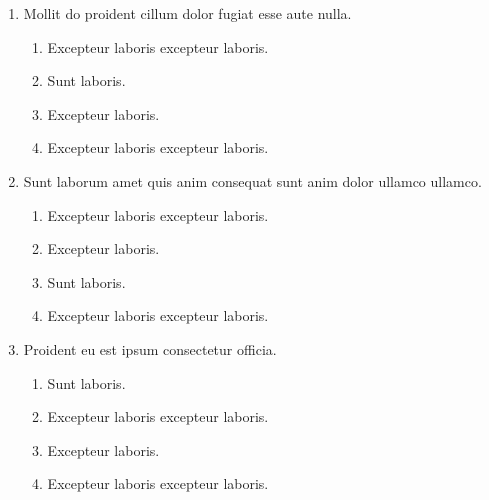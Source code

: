 \documentclass[a4paper,12pt]{article}
\begin{document}
\begin{enumerate}[label=\textbf{\arabic*.}]
\item Mollit do proident cillum dolor fugiat esse aute nulla.
\begin{multicols}{2}
	\begin{enumerate}
		\item  Excepteur laboris excepteur laboris.
  
		\item  Sunt laboris.
    
		\item  Excepteur laboris.
    
		\item  Excepteur laboris excepteur laboris.
    
	\end{enumerate}

\end{multicols}
\item Sunt laborum amet quis anim consequat sunt anim dolor ullamco ullamco.
\begin{multicols}{2}
	\begin{enumerate}
		\item  Excepteur laboris excepteur laboris.
  
		\item  Excepteur laboris.
    
		\item  Sunt laboris.
    
		\item  Excepteur laboris excepteur laboris.
    
	\end{enumerate}

\end{multicols}
\item Proident eu est ipsum consectetur officia.
\begin{multicols}{2}
	\begin{enumerate}
		\item  Sunt laboris.
    
		\item  Excepteur laboris excepteur laboris.
    
		\item  Excepteur laboris.
    
		\item  Excepteur laboris excepteur laboris.
  
	\end{enumerate}


\end{multicols}
\end{enumerate}
\end{document}
